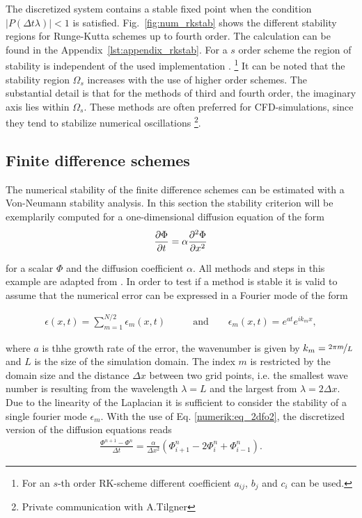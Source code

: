 The discretized system contains a stable fixed point when the condition $|P(\Delta t \lambda)| < 1$ is satisfied.
Fig.~\ref{fig:num_rkstab} shows the different stability regions for Runge-Kutta schemes up to fourth order.
The calculation can be found in the Appendix~\ref{lst:appendix_rkstab}.
For a $s$ order scheme the region of stability is independent of the used implementation \citep{canuto2007}.
\footnote{For an $s$-th order RK-scheme different coefficient $a_{ij}$, $b_j$ and $c_i$ can be used.}
It can be noted that the stability region $\Omega_s$ increases with the use of higher order schemes.
The substantial detail is that for the  methods of third and fourth order, the imaginary axis lies within $\Omega_s$.
These methods are often preferred for  CFD-simulations, since they tend to stabilize numerical oscillations \footnote{Private communication with A.Tilgner}.

\subsection{Finite difference schemes}

The numerical stability of the finite difference schemes can be estimated with a Von-Neumann stability analysis.
In this section the stability criterion will be exemplarily computed for a one-dimensional diffusion equation of the form
\begin{align}
    \label{num:vne_diffusion_theo}
    \pdn[\Phi]{t} = \alpha  \pdn[^2\Phi]{x^2}
\end{align}

for a scalar $\Phi$ and  the diffusion coefficient $\alpha$.
All methods and steps in this example are adapted from \citep{janderson}.
In order to test if a method is stable it is valid to assume that the numerical error can be expressed in a Fourier mode of the form

\begin{align}
    \epsilon(x, t) = \sum_{m=1}^{N/2} \epsilon_m(x, t) \qquad &\text{and} \qquad  \epsilon_m(x, t) = e^{at}e^{i k_m x},
\end{align}

where $a$  is thhe growth rate of the error, the wavenumber is given by $k_m=\nicefrac{2\pi m}{L}$ and $L$ is the size of the simulation domain.
The index $m$ is restricted by the domain size and the distance $\Delta x$ between two grid points, i.e. the smallest wave number
is resulting from the wavelength $\lambda=L$ and the largest from $\lambda=2\Delta x$.
Due to the linearity of the Laplacian it is sufficient to consider the stability of a single fourier mode $\epsilon_m$.
With the use of Eq.  \ref{numerik:eq_2dfo2}, the discretized version of the diffusion equations reads
\begin{align}
    \label{num:neumann_diffusion_eq}
    \frac{\Phi^{n+1} - \Phi^n}{\Delta t} = \frac{\alpha}{\Delta x^2}\left(\Phi_{i+1}^n - 2\Phi_{i}^n + \Phi_{i-1}^n\right).
\end{align}

